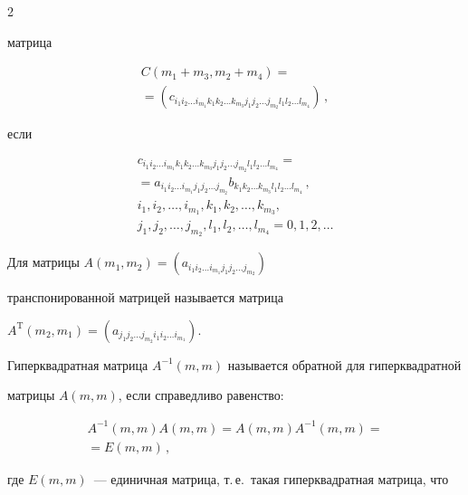 \begin{multicols}{2}
{мат\-ри\-ца 


\begin{multline*}


C(m_1 + m_3,m_2 + m_4)={}\\


{}= (c_{i_1 i_2 \dots i_{m_1} k_1 k_2 \dots k_{m_3} j_1 j_2 \dots j_{m_2} l_1 l_2 \dots l_{m_4}})\,,


\end{multline*} 


если


\begin{multline*}


  c_{i_1 i_2 \dots i_{m_1} k_1 k_2 \dots k_{m_3} j_1 j_2 \dots j_{m_2} l_1 l_2 \dots l_{m_4}} ={}\\


  {}= a_{i_1 i_2 \dots i_{m_1} j_1 j_2 \dots j_{m_2}}  b_{k_1 k_2 \dots k_{m_3} l_1 l_2 \dots l_{m_4}}\,, \\


  i_1,i_2,\dots,i_{m_1},k_1,k_2,\dots,k_{m_3},\\


  j_1,j_2,\dots,j_{m_2},l_1,l_2,\dots,l_{m_4} = 0,1,2,\dots


\end{multline*}





Для матрицы $A(m_1,m_2) = (a_{i_1 i_2 \dots i_{m_1} j_1 j_2 \dots j_{m_2}})$ 


транспонированной матрицей называется матрица 


$A^\mathrm{T}(m_2,m_1) = (a_{j_1 j_2 \dots j_{m_2} i_1 i_2 \dots i_{m_1}})$.





Гиперквадратная матрица $A^{-1}(m,m)$ называется обратной для гиперквадратной 


мат\-ри\-цы $A(m,m)$, если справедливо равенство:


\begin{multline}


\label{eqMatrixInvert}


  A^{-1}(m,m)  A(m,m) = A(m,m)  A^{-1}(m,m) ={}\\


  {}= E(m,m)\,,


\end{multline}


где $E(m,m)$~--- единичная матрица, т.\,е.\ такая гиперквадратная матрица, что


}
\end{multicols}
